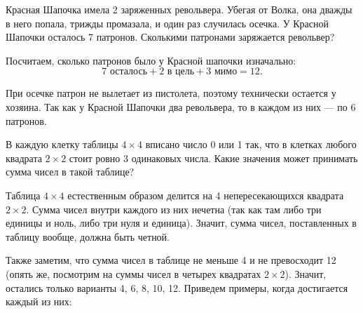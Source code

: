 
\begin{itemize}

	\itA Красная Шапочка имела 2 заряженных револьвера. Убегая от Волка, она дважды в него попала, трижды промазала, и один раз случилась осечка. У Красной Шапочки осталось 7 патронов. Сколькими патронами заряжается револьвер?
	
	\itr Посчитаем, сколько патронов было у Красной шапочки изначально:
	$$7\text{ осталось} + 2\text{ в цель} + 3\text{ мимо} = 12.$$
	
	При осечке патрон не вылетает из пистолета, поэтому технически остается у хозяина. Так как у Красной Шапочки два револьвера, то в каждом из них — по 6 патронов.
	
	\itB В каждую клетку таблицы $4 \times 4$ вписано число 0 или 1 так, что в клетках любого квадрата $2 \times 2$ стоит ровно 3 одинаковых числа. Какие значения может принимать сумма чисел в такой таблице?
	
	\itr Таблица $4 \times 4$ естественным образом делится на 4 непересекающихся квадрата $2 \times 2$. Сумма чисел внутри каждого из них нечетна (так как там либо три единицы и ноль, либо три нуля и единица). Значит, сумма чисел, поставленных в таблицу вообще, должна быть четной.
	
	Также заметим, что сумма чисел в таблице не меньше 4 и не превосходит 12 (опять же, посмотрим на суммы чисел в четырех квадратах $2 \times 2$). Значит, остались только варианты 4, 6, 8, 10, 12. Приведем примеры, когда достигается каждый из них:
	

\end{itemize}
